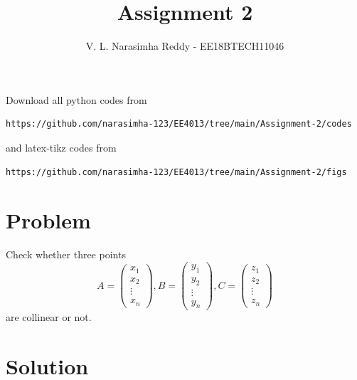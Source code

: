 \documentclass[journal,12pt,twocolumn]{IEEEtran}
\begin{document}
\def\putbox#1#2#3{\makebox[0in][l]{\makebox[#1][l]{}\raisebox{\baselineskip}[0in][0in]{\raisebox{#2}[0in][0in]{#3}}}}
\def\rightbox#1{\makebox[0in][r]{#1}}
\def\centbox#1{\makebox[0in]{#1}}
\def\topbox#1{\raisebox{-\baselineskip}[0in][0in]{#1}}
\def\midbox#1{\raisebox{-0.5\baselineskip}[0in][0in]{#1}}
\vspace{3cm}
\title{Assignment 2}
\author{V. L. Narasimha Reddy - EE18BTECH11046}
\maketitle
\newpage
\bigskip
\renewcommand{\thefigure}{\theenumi}
\renewcommand{\thetable}{\theenumi}
Download all python codes from
\begin{lstlisting}
https://github.com/narasimha-123/EE4013/tree/main/Assignment-2/codes
\end{lstlisting}
%
and latex-tikz codes from
%
\begin{lstlisting}
https://github.com/narasimha-123/EE4013/tree/main/Assignment-2/figs
\end{lstlisting}
\section{Problem}
Check whether three points
\[
    A =
    \begin{pmatrix}
        x_{1}  \\
        x_{2}  \\
        \vdots \\
        x_{n}
    \end{pmatrix},
    B =
    \begin{pmatrix}
        y_{1}  \\
        y_{2}  \\
        \vdots \\
        y_{n}
    \end{pmatrix},
    C =
    \begin{pmatrix}
        z_{1}  \\
        z_{2}  \\
        \vdots \\
        z_{n}
    \end{pmatrix}
\]
are collinear or not.

\section{Solution}
\end{document}
